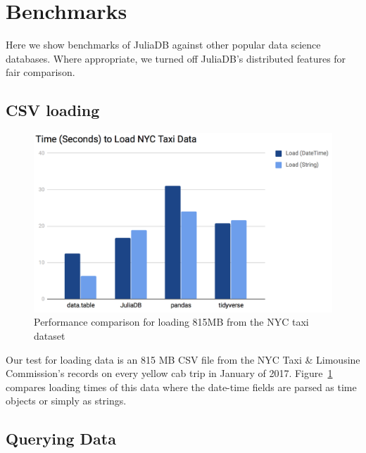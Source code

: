 \documentclass{juliacon}
\begin{document}
\section{Benchmarks}

Here we show benchmarks of JuliaDB against other popular data science
databases. Where appropriate, we turned off JuliaDB's distributed
features for fair comparison.

\subsection{CSV loading}

\begin{figure}[h]
\centering \includegraphics[width=5in]{image8.png} \caption{Performance comparison for loading 815MB from the NYC taxi dataset}
\label{fig:nyctaxiload} 
\end{figure}
Our test for loading data is an 815 MB CSV file from the NYC Taxi
\& Limousine Commission’s records on every yellow cab trip in January
of 2017. Figure~\ref{fig:nyctaxiload} compares loading times of
this data where the date-time fields are parsed as time objects or
simply as strings.

\subsection{Querying Data}
\end{document}
